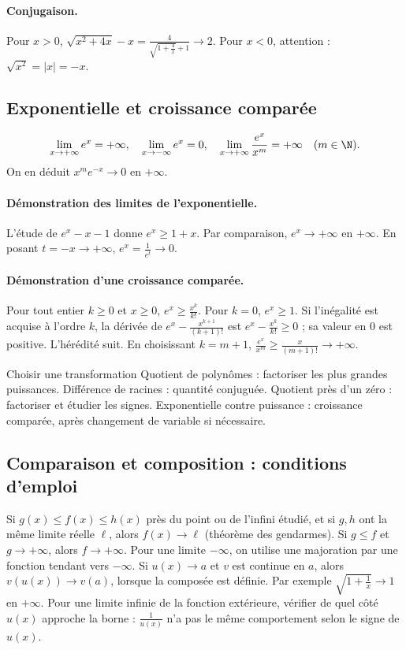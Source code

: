 \paragraph{Conjugaison.} Pour $x>0$, $\sqrt{x^2+4x}-x=\frac{4}{\sqrt{1+\frac{4}{x}}+1}\to2$. Pour $x<0$, attention : $\sqrt{x^2}=|x|=-x$.
\subsection{Exponentielle et croissance comparée}
\[\lim_{x\to+\infty}e^x=+\infty,\quad\lim_{x\to-\infty}e^x=0,\quad
\lim_{x\to+\infty}\frac{e^x}{x^m}=+\infty\quad(m\in\N).\]
On en déduit $x^me^{-x}\to0$ en $+\infty$.
\paragraph{Démonstration des limites de l'exponentielle.} L'étude de $e^x-x-1$ donne $e^x\ge1+x$. Par comparaison, $e^x\to+\infty$ en $+\infty$. En posant $t=-x\to+\infty$, $e^x=\frac{1}{e^t}\to0$.
\paragraph{Démonstration d'une croissance comparée.} Pour tout entier $k\ge0$ et $x\ge0$, $e^x\ge \frac{x^k}{k!}$. Pour $k=0$, $e^x\ge1$. Si l'inégalité est acquise à l'ordre $k$, la dérivée de $e^x-\frac{x^{k+1}}{(k+1)!}$ est $e^x-\frac{x^k}{k!}\ge0$ ; sa valeur en $0$ est positive. L'hérédité suit. En choisissant $k=m+1$, $\frac{e^x}{x^m}\ge \frac{x}{(m+1)!}\to+\infty$.
\begin{methode}{Choisir une transformation}
Quotient de polynômes : factoriser les plus grandes puissances. Différence de racines : quantité conjuguée. Quotient près d'un zéro : factoriser et étudier les signes. Exponentielle contre puissance : croissance comparée, après changement de variable si nécessaire.
\end{methode}
\subsection{Comparaison et composition : conditions d'emploi}
Si $g(x)\le f(x)\le h(x)$ près du point ou de l'infini étudié, et si $g,h$ ont la même limite réelle $\ell$, alors $f(x)\to\ell$ (théorème des gendarmes). Si $g\le f$ et $g\to+\infty$, alors $f\to+\infty$. Pour une limite $-\infty$, on utilise une majoration par une fonction tendant vers $-\infty$.
Si $u(x)\to a$ et $v$ est continue en $a$, alors $v(u(x))\to v(a)$, lorsque la composée est définie. Par exemple $\sqrt{1+\frac{1}{x}}\to1$ en $+\infty$. Pour une limite infinie de la fonction extérieure, vérifier de quel côté $u(x)$ approche la borne : $\frac{1}{u(x)}$ n'a pas le même comportement selon le signe de $u(x)$.


